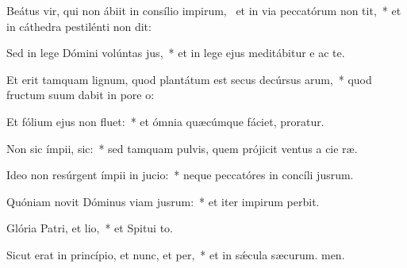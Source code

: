 \item Beátus vir, qui non ábiit in consílio impirum,~\pscross{} et in via peccatórum non tit,~* et in cáthedra pestilénti non dit:
\item Sed in lege Dómini volúntas jus,~* et in lege ejus meditábitur e ac te.
\item Et erit tamquam lignum, quod plantátum est secus decúrsus arum,~* quod fructum suum dabit in pore o:
\item Et fólium ejus non fluet:~* et ómnia quæcúmque fáciet, proratur.
\item Non sic ímpii,  sic:~* sed tamquam pulvis, quem prójicit ventus a cie ræ.
\item Ideo non resúrgent ímpii in jucio:~* neque peccatóres in concíli jusrum.
\item Quóniam novit Dóminus viam jusrum:~* et iter impirum perbit.
\item Glória Patri, et lio,~* et Spitui to.
\item Sicut erat in princípio, et nunc, et per,~* et in sǽcula sæcurum. men.
